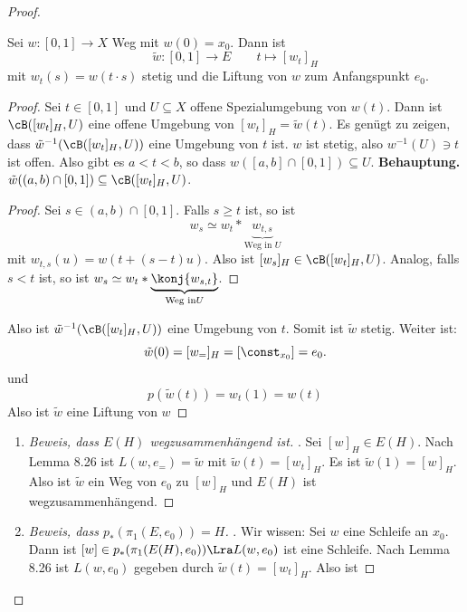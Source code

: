 \documentclass[language=ngerman]{TemplateLecture} %
\begin{document}
\begin{proof}
\begin{description}
\begin{description}
            \begin{lem}{}{}
                Sei \(w\colon [0,1] \to X\) Weg mit \(w(0) = x_0\). Dann ist
                \[\tilde w \colon [0,1] \to E \qquad t \mapsto [w_t]_H\]
                mit \(w_t(s) = w(t\cdot s)\) stetig und die Liftung von \(w\) zum Anfangspunkt \(e_0\).
            \end{lem}
            \begin{proof}
                Sei \(t \in [0,1]\) und \(U\subseteq X\) offene Spezialumgebung von \(w(t)\). Dann ist \(\cB([w_t]_H, U)\) eine offene Umgebung von \([w_t]_H = \tilde w (t)\). Es genügt zu zeigen, dass \(\tilde w^{-1}(\cB([w_t]_H, U))\) eine Umgebung von \(t\) ist.
                \(w\) ist stetig, also \(w^{-1}(U) \ni t\) ist offen. Also gibt es \(a< t < b\), so dass \(w([a,b] \cap [0,1]) \subseteq U\).
                \textbf{Behauptung.} \(\tilde w ((a,b) \cap [0,1]) \subseteq \cB([w_t]_H,U)\).
                \begin{proof}
                    Sei \(s \in (a,b) \cap [0,1]\). Falls \(s \geq t\) ist, so ist 
                    \[w_s \simeq w_t * \underbrace{w_{t,s}}_{\text{Weg in } U}\]
                    mit \(w_{t,s}(u) = w(t + (s-t)u)\).
                    Also ist \([w_s]_H \in \cB([w_t]_H, U)\).
                    Analog, falls \(s< t\) ist, so ist \(w_s \simeq w_t * \underbrace{\konj{w_{s,t}}}_{\text{Weg in} U}\).
                \end{proof}
                Also ist \(\tilde w^{-1}( \cB([w_t]_H, U))\) eine Umgebung von \(t\). Somit ist \(\tilde w\) stetig. Weiter ist:
                \[\tilde w(0) = [w_=]_H = [\const_{x_0}] = e_0.\]
                und 
                \[p(\tilde w (t)) = w_t(1) = w(t)\]
                Also ist \(\tilde w\) eine Liftung von \(w\)
            \end{proof}
            \begin{enumerate}
                \item \begin{proof}[Beweis, dass \(E(H)\) wegzusammenhängend ist]. Sei \([w]_H \in E(H)\). Nach Lemma 8.26 ist \(L(w, e_=) = \tilde w\) mit \(\tilde w (t) = [w_t]_H\). Es ist \(\tilde w(1) = [w]_H\). Also ist \(\tilde w\) ein Weg von \(e_0\) zu \([w]_H\) und \(E(H)\) ist wegzusammenhängend.
                \end{proof}
                \item \begin{proof}[Beweis, dass \(p_*(\pi_1(E,e_0)) = H\)]. Wir wissen: Sei \(w\) eine Schleife an \(x_0\). Dann ist \([w] \in p_*(\pi_1(E(H),e_0)) \Lra L(w, e_0)\) ist eine Schleife. Nach Lemma 8.26 ist \(L(w, e_0)\) gegeben durch \(\tilde w(t) = [w_t]_H\). Also ist

\end{proof}
\end{enumerate}
\end{description}
\end{description}
\end{proof}
\end{document}
